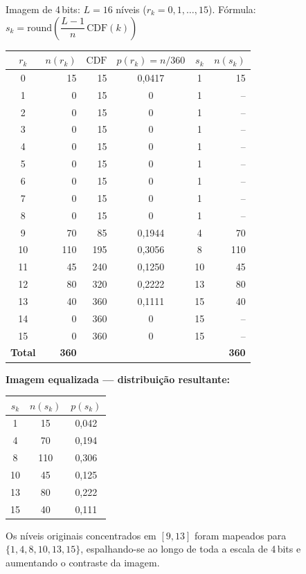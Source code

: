 \documentclass[12pt,a4paper,oneside,brazil]{abntex2}
\begin{document}
\begin{resposta}

Imagem de 4\,bits: $L = 16$ n\'iveis ($r_k = 0, 1, \ldots, 15$).
F\'ormula: $s_k = \mathrm{round}\!\left(\dfrac{L-1}{n}\,\mathrm{CDF}(k)\right)$

\begin{center}
\small
\setlength{\tabcolsep}{5pt}
\begin{tabular}{crrccr}
  \toprule
  $r_k$ & $n(r_k)$ & $\text{CDF}$ & $p(r_k)=n/360$ & $s_k$ & $n(s_k)$ \\
  \midrule
  0  & 15  & 15  & 0,0417 & 1  & 15 \\
  1  &  0  & 15  & 0      & 1  & -- \\
  2  &  0  & 15  & 0      & 1  & -- \\
  3  &  0  & 15  & 0      & 1  & -- \\
  4  &  0  & 15  & 0      & 1  & -- \\
  5  &  0  & 15  & 0      & 1  & -- \\
  6  &  0  & 15  & 0      & 1  & -- \\
  7  &  0  & 15  & 0      & 1  & -- \\
  8  &  0  & 15  & 0      & 1  & -- \\
  9  & 70  & 85  & 0,1944 & 4  & 70 \\
  10 & 110 & 195 & 0,3056 & 8  & 110 \\
  11 &  45 & 240 & 0,1250 & 10 &  45 \\
  12 &  80 & 320 & 0,2222 & 13 &  80 \\
  13 &  40 & 360 & 0,1111 & 15 &  40 \\
  14 &   0 & 360 & 0      & 15 & -- \\
  15 &   0 & 360 & 0      & 15 & -- \\
  \midrule
  \textbf{Total} & \textbf{360} & & & & \textbf{360} \\
  \bottomrule
\end{tabular}
\end{center}

\medskip
\textbf{Imagem equalizada --- distribui\c{c}\~ao resultante:}

\begin{center}
\small
\begin{tabular}{ccc}
  \toprule
  $s_k$ & $n(s_k)$ & $p(s_k)$ \\
  \midrule
   1 &  15 & 0,042 \\
   4 &  70 & 0,194 \\
   8 & 110 & 0,306 \\
  10 &  45 & 0,125 \\
  13 &  80 & 0,222 \\
  15 &  40 & 0,111 \\
  \bottomrule
\end{tabular}
\end{center}

Os n\'iveis originais concentrados em $[9,13]$ foram mapeados para
$\{1, 4, 8, 10, 13, 15\}$, espalhando-se ao longo de toda a escala
de 4\,bits e aumentando o contraste da imagem.

\end{resposta}
\end{document}
